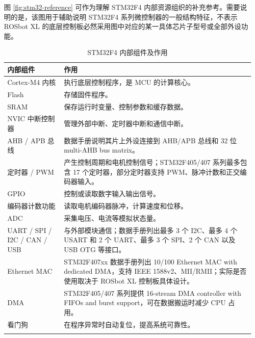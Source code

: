 \documentclass[UTF8,a4paper,12pt]{ctexrep}
\renewcommand{\arraystretch}{1.35}
\newcommand{\tabrowline}{\specialrule{0.25pt}{0pt}{0pt}}
\begin{document}
图 \ref{fig:stm32-reference} 可作为理解 STM32F4 内部资源组织的补充参考。需要说明的是，该图用于辅助说明 STM32F4 系列微控制器的一般结构特征，不表示 ROSbot XL 的底层控制板必然采用图中对应的某一具体芯片子型号或全部外设功能。

\begin{table}[H]
  \centering
  \caption{STM32F4 内部组件及作用}
  \label{tab:stm32-internal}
  \small
  \renewcommand{\arraystretch}{0.95}
  \begin{tabularx}{\textwidth}{L{3.8cm}Y}
    \toprule
    \textbf{内部组件} & \textbf{作用} \\
    \midrule
    Cortex-M4 内核 & 执行底层控制程序，是 MCU 的计算核心。 \\
    \tabrowline
    Flash & 存储固件程序。 \\
    \tabrowline
    SRAM & 保存运行时变量、控制参数和缓存数据。 \\
    \tabrowline
    NVIC 中断控制器 & 管理外部中断、定时器中断和通信中断。 \\
    \tabrowline
    AHB / APB 总线 & 数据手册说明其片上外设连接到 AHB/APB 总线和 32 位 multi-AHB bus matrix。 \\
    \tabrowline
    定时器 / PWM & 产生控制周期和电机控制信号；STM32F405/407 系列最多包含 17 个定时器，部分定时器支持 PWM、脉冲计数和正交编码器输入。 \\
    \tabrowline
    GPIO & 控制或读取数字输入输出信号。 \\
    \tabrowline
    编码器计数功能 & 读取电机编码器脉冲，计算速度和位移。 \\
    \tabrowline
    ADC & 采集电压、电流等模拟状态量。 \\
    \tabrowline
    UART / SPI / I2C / CAN / USB & 与外部模块通信；数据手册列出最多 3 个 I2C、最多 4 个 USART 和 2 个 UART、最多 3 个 SPI、2 个 CAN 以及 USB OTG 等接口。 \\
    \tabrowline
    Ethernet MAC & STM32F407xx 数据手册列出 10/100 Ethernet MAC with dedicated DMA，支持 IEEE 1588v2、MII/RMII；实际是否使用取决于 ROSbot XL 控制板具体设计。 \\
    \tabrowline
    DMA & STM32F405/407 系列提供 16-stream DMA controller with FIFOs and burst support，可在数据搬运时减少 CPU 占用。 \\
    \tabrowline
    看门狗 & 在程序异常时自动复位，提高系统可靠性。 \\
    \bottomrule
  \end{tabularx}
  \renewcommand{\arraystretch}{1.18}
\end{table}
\end{document}

